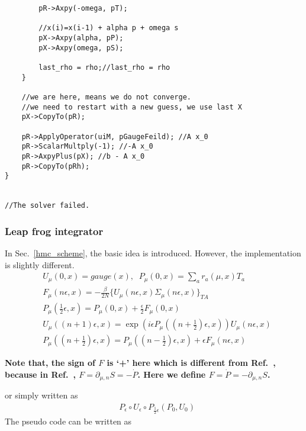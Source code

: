 \begin{lstlisting}
        pR->Axpy(-omega, pT);

        //x(i)=x(i-1) + alpha p + omega s
        pX->Axpy(alpha, pP);
        pX->Axpy(omega, pS);

        last_rho = rho;//last_rho = rho
    }

    //we are here, means we do not converge.
    //we need to restart with a new guess, we use last X
    pX->CopyTo(pR);

    pR->ApplyOperator(uiM, pGaugeFeild); //A x_0
    pR->ScalarMultply(-1); //-A x_0
    pR->AxpyPlus(pX); //b - A x_0
    pR->CopyTo(pRh);
}


//The solver failed.

\end{lstlisting}


\subsubsection{\label{Leap frog}Leap frog integrator}

In Sec.~\ref{hmc_scheme}, the basic idea is introduced. However, the implementation is slightly different.
\begin{subequations}
\begin{eqnarray}
&U_{\mu}(0,x)=gauge(x),\;\;P_{\mu}(0,x)=\sum _{a}r_a(\mu,x)T_a\\
&F_{\mu}(n\epsilon,x)=-\frac{\beta}{2N}\{U_{\mu}(n\epsilon,x)\Sigma _{\mu}(n\epsilon,x)\}_{TA}\\
&P_{\mu}(\frac{1}{2}\epsilon,x)=P_{\mu}(0,x)+\frac{\epsilon}{2}F_{\mu}(0,x)\\
&U_{\mu}((n+1)\epsilon,x)=\exp \left(i\epsilon P_{\mu}((n+\frac{1}{2})\epsilon,x)\right)U_{\mu}(n\epsilon,x)\\
&P_{\mu}((n+\frac{1}{2})\epsilon,x)=P_{\mu}((n-\frac{1}{2})\epsilon,x)+\epsilon F_{\mu}(n\epsilon,x)
\end{eqnarray}
\label{eq.hmc.update_leapfrog}
\end{subequations}

\textcolor[rgb]{1,0,0}{\textbf{Note that, the sign of $F$ is `+' here which is different from Ref.~\cite{latticeqcdbook2010}, because in Ref.~\cite{latticeqcdbook2010}, $F=\partial _{\mu,n}S = -\dot{P}$. Here we define $F=\dot{P}=-\partial _{\mu,n}S$.}}

or simply written as
\begin{equation}
\begin{split}
&P_{\epsilon}\circ U_{\epsilon}\circ P_{\frac{1}{2}\epsilon}\left(P_0,U_0\right)
\end{split}
\label{eq.hmc.update_leapfrog2}
\end{equation}
The pseudo code can be written as


